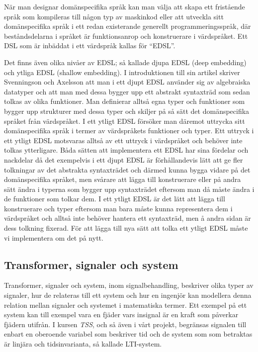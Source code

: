 \documentclass[12pt,a4paper,twoside,openright]{article}
\begin{document}
När man designar domänspecifika språk kan man välja att skapa ett
fristående språk som kompileras till någon typ av maskinkod eller att
utveckla sitt domänspecifika språk i ett redan existerande generellt
programmeringsspråk, där beståndsdelarna i språket är funktionsanrop
och konstruerare i värdspråket. Ett DSL som är inbäddat i ett
värdspråk kallas för ``\gls{EDSL}''.

Det finns även olika nivåer av EDSL; så kallade djupa EDSL (deep
embedding) och ytliga EDSL (shallow embedding). I introduktionen till
sin artikel skriver Svenningson och Axelsson \cite{Svenningsson2013}
att man i ett djupt EDSL använder sig av algebraiska datatyper och att
man med dessa bygger upp ett abstrakt syntaxträd som sedan tolkas av
olika funktioner. Man definierar alltså egna typer och funktioner som
bygger upp strukturer med dessa typer och skiljer på så sätt det
domänspecifika språket från värdspråket. I ett ytligt EDSL försöker
man däremot uttrycka sitt domänspecifika språk i termer av
värdspråkets funktioner och typer. Ett uttryck i ett ytligt EDSL
motsvaras alltså av ett uttryck i värdspråket och behöver inte tolkas
ytterligare. Båda sätten att implementera ett EDSL har sina fördelar
och nackdelar då det exempelvis i ett djupt EDSL är förhållandevis
lätt att ge fler tolkningar av det abstrakta syntaxträdet och därmed
kunna bygga vidare på det domänspecifika språket, men svårare att
lägga till konstruerare eller på andra sätt ändra i typerna som bygger
upp syntaxträdet eftersom man då måste ändra i de funktioner som
tolkar dem. I ett ytligt EDSL är det lätt att lägga till konstruerare
och typer eftersom man bara måste kunna representera dem i värdspråket
och alltså inte behöver hantera ett syntaxträd, men å andra sidan är
dess tolkning fixerad. För att lägga till nya sätt att tolka ett
ytligt EDSL måste vi implementera om det på nytt.

\subsection{Transformer, signaler och system}
Transformer, signaler och system, inom signalbehandling, beskriver
olika typer av signaler, hur de relateras till ett system och hur en
ingenjör kan modellera denna relation mellan signaler och systemet i
matematiska termer. Ett exempel på ett system kan till exempel vara en
fjäder vars insignal är en kraft som påverkar fjädern utifrån. I
kursen \textit{TSS}, och så även i vårt projekt, begränsas signalen
till enbart en oberoende variabel som beskriver tid och de system som
som betraktas är linjära och tidsinvarianta, så kallade LTI-system.
\end{document}
